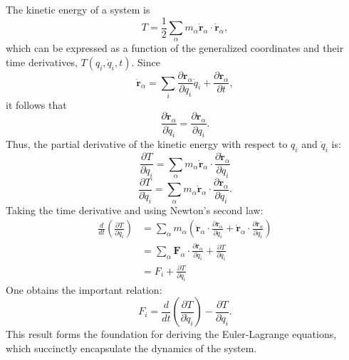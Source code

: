 The kinetic energy of a system is
\begin{equation}
    T = \frac{1}{2}\sum_\alpha m_\alpha \dot{\mathbf{r}}_\alpha \cdot \dot{\mathbf{r}}_\alpha,
\end{equation}
which can be expressed as a function of the generalized coordinates and their time derivatives, \(T(q_i,\dot{q}_i,t)\). Since
\begin{equation}
    \dot{\mathbf{r}}_\alpha = \sum_i \frac{\partial \mathbf{r}_\alpha}{\partial q_i}\dot{q}_i + \frac{\partial \mathbf{r}_\alpha}{\partial t},
\end{equation}
it follows that
\begin{equation}
    \frac{\partial \dot{\mathbf{r}}_\alpha}{\partial \dot{q}_i} = \frac{\partial \mathbf{r}_\alpha}{\partial q_i}.
\end{equation}
Thus, the partial derivative of the kinetic energy with respect to \(q_i\) and \(\dot{q}_i\) is:
\begin{equation}
    \frac {\partial T}{\partial q_i}  = \sum_\alpha m_\alpha \dot{\mathbf{r}}_\alpha \cdot \frac{\partial \dot{\mathbf{r}}_\alpha}{\partial q_i}
\end{equation}
\begin{equation}
    \frac{\partial T}{\partial \dot{q}_i} = \sum_\alpha m_\alpha \dot{\mathbf{r}}_\alpha \cdot \frac{\partial \mathbf{r}_\alpha}{\partial q_i}.
\end{equation}
Taking the time derivative and using Newton's second law:
\begin{align}
    \frac{d}{dt} \left(\frac {\partial T}{\partial \dot{q_i}}\right) & = \sum_\alpha m_\alpha \left(\ddot{\mathbf{r}}_\alpha \cdot \frac{\partial \mathbf{r}_\alpha}{\partial q_i} + \dot{\mathbf{r}}_\alpha \cdot \frac{\partial \dot{\mathbf{r}}_\alpha}{\partial q_i}\right) \\
                                                                     & = \sum_\alpha \mathbf{F}_\alpha \cdot \frac{\partial \mathbf{r}_\alpha}{\partial q_i} + \frac{\partial T}{\partial q_i} \\
                                                                     & = F_i + \frac{\partial T}{\partial q_i}  
\end{align}
One obtains the important relation:
\begin{equation}
    F_i = \frac{d}{dt}\left(\frac{\partial T}{\partial \dot{q}_i}\right) - \frac{\partial T}{\partial q_i}.
\end{equation}
This result forms the foundation for deriving the Euler-Lagrange equations, which succinctly encapsulate the dynamics of the system.

